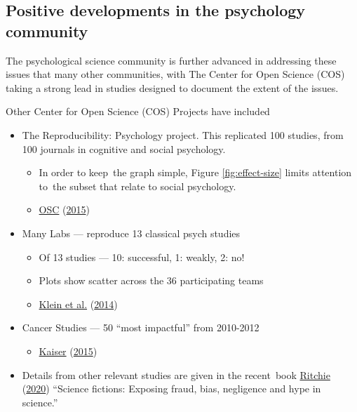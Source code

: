 \documentclass[
  10pt,
  b5paper]{book}
\providecommand{\tightlist}{%
  \setlength{\itemsep}{0pt}\setlength{\parskip}{0pt}}
\begin{document}
\hypertarget{positive-developments-in-the-psychology-community}{%
\subsection*{Positive developments in the psychology community}\label{positive-developments-in-the-psychology-community}}

The psychological science community is further advanced in
addressing these issues that many other communities, with
The Center for Open Science (COS) taking a strong lead in
studies designed to document the extent of the issues.

Other Center for Open Science (COS) Projects have included

\begin{itemize}
\tightlist
\item
  The Reproducibility: Psychology project. This replicated
  100 studies, from 100 journals in cognitive and social
  psychology.

  \begin{itemize}
  \tightlist
  \item
    In order to keep~the graph simple, Figure
    \ref{fig:effect-size} limits attention to~the
    subset that relate to social psychology.
  \item
    \protect\hyperlink{ref-osc_EstRep2015}{OSC} (\protect\hyperlink{ref-osc_EstRep2015}{2015})
  \end{itemize}
\item
  Many Labs --- reproduce 13 classical psych studies

  \begin{itemize}
  \tightlist
  \item
    Of 13 studies --- 10: successful, 1: weakly, 2: no!
  \item
    Plots show scatter across the 36 participating teams
  \item
    \protect\hyperlink{ref-r7_klein_others_2014}{Klein et al.} (\protect\hyperlink{ref-r7_klein_others_2014}{2014})
  \end{itemize}
\item
  Cancer Studies --- 50 ``most impactful'' from 2010-2012

  \begin{itemize}
  \tightlist
  \item
    \protect\hyperlink{ref-r5_kaiser_2015}{Kaiser} (\protect\hyperlink{ref-r5_kaiser_2015}{2015})
  \end{itemize}
\item
  Details from other relevant studies are given in the
  recent~book \protect\hyperlink{ref-ritchie2020science}{Ritchie} (\protect\hyperlink{ref-ritchie2020science}{2020}) ``Science fictions: Exposing
  fraud, bias, negligence and hype in science.''
\end{itemize}
\end{document}
